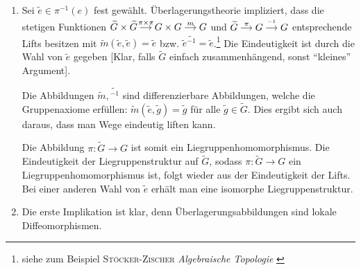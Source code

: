 \begin{beweis}
    \begin{enumerate}[(1)]
        \item Sei $\widetilde{e} \in \pi^{-1}(e)$ fest gewählt.
        Überlagerungstheorie impliziert, dass die stetigen Funktionen $\begin{tikzcd}[cramped,sep=small]
        	\widetilde{G} \times \widetilde{G} \rar["\pi \times \pi"] & G \times G \rar["m"] & G
        \end{tikzcd}$ und $\begin{tikzcd}[cramped,sep=small]
        	\widetilde{G} \rar["\pi"] & G \rar["^{-1}"] & G
        \end{tikzcd}$
		entsprechende Lifts besitzen mit $\widetilde{m}(\widetilde{e},\widetilde{e})=\widetilde{e}$ bzw. $\widetilde{e}\widetilde{{}^{-1}} = \widetilde{e}$.\footnote{siehe zum Beispiel \textsc{Stöcker-Zischer} \emph{Algebraische Topologie} \cite[Abschnitt 6.2]{stockerAlgTop}}
        Die Eindeutigkeit ist durch die Wahl von $\widetilde{e}$ gegeben [Klar, falls $\widetilde{G}$ einfach zusammenhängend, sonst \enquote{kleines} Argument].
        
        Die Abbildungen $\widetilde{m},\widetilde{{ }^{-1}}$ sind differenzierbare Abbildungen, welche die Gruppenaxiome erfüllen: $\widetilde{m} (\widetilde{e}, \widetilde{g}) = \widetilde{g}$ für alle $\widetilde{g} \in \widetilde{G}$.
        Dies ergibt sich auch daraus, dass man Wege eindeutig liften kann.
        
        Die Abbildung $\pi \colon \widetilde{G} \to G$ ist somit ein Liegruppenhomomorphismus.
        Die Eindeutigkeit der Liegruppenstruktur auf $\widetilde{G}$, sodass $\pi \colon \widetilde{G} \to G$ ein Liegruppenhomomorphismus ist, folgt wieder aus der Eindeutigkeit der Lifts.
		Bei einer anderen Wahl von $\widetilde{e}$ erhält man eine isomorphe Liegruppenstruktur.
        \item Die erste Implikation ist klar, denn Überlagerungsabbildungen sind lokale Diffeomorphismen.
        

\end{enumerate}
\end{beweis}
